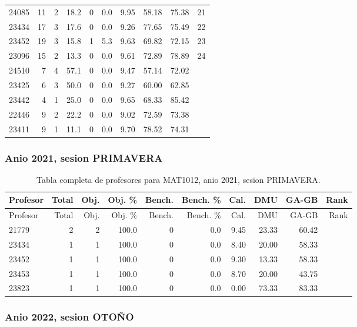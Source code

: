 \begin{longtable}{lrrrrrrrrr}
24085 & 11 & 2 & 18.2 & 0 & 0.0 & 9.95 & 58.18 & 75.38 & 21 \\
23434 & 17 & 3 & 17.6 & 0 & 0.0 & 9.26 & 77.65 & 75.49 & 22 \\
23452 & 19 & 3 & 15.8 & 1 & 5.3 & 9.63 & 69.82 & 72.15 & 23 \\
23096 & 15 & 2 & 13.3 & 0 & 0.0 & 9.61 & 72.89 & 78.89 & 24 \\
24510 & 7 & 4 & 57.1 & 0 & 0.0 & 9.47 & 57.14 & 72.02 &  \\
23425 & 6 & 3 & 50.0 & 0 & 0.0 & 9.27 & 60.00 & 62.85 &  \\
23442 & 4 & 1 & 25.0 & 0 & 0.0 & 9.65 & 68.33 & 85.42 &  \\
22446 & 9 & 2 & 22.2 & 0 & 0.0 & 9.02 & 72.59 & 73.38 &  \\
23411 & 9 & 1 & 11.1 & 0 & 0.0 & 9.70 & 78.52 & 74.31 &  \\
\bottomrule
\end{longtable}
\endgroup

\subsubsection{Anio 2021, sesion PRIMAVERA}

\begingroup
\scriptsize
\setlength{\tabcolsep}{3pt}
\begin{longtable}{lrrrrrrrrr}
\caption{Tabla completa de profesores para MAT1012, anio 2021, sesion PRIMAVERA.}\label{tab:prof-period-mat1012-2021-primavera-especializado}\\
\toprule
Profesor & Total & Obj. & Obj. \% & Bench. & Bench. \% & Cal. & DMU & GA-GB & Rank \\
\midrule
\endfirsthead
\toprule
Profesor & Total & Obj. & Obj. \% & Bench. & Bench. \% & Cal. & DMU & GA-GB & Rank \\
\midrule
\endhead
21779 & 2 & 2 & 100.0 & 0 & 0.0 & 9.45 & 23.33 & 60.42 &  \\
23434 & 1 & 1 & 100.0 & 0 & 0.0 & 8.40 & 20.00 & 58.33 &  \\
23452 & 1 & 1 & 100.0 & 0 & 0.0 & 9.30 & 13.33 & 58.33 &  \\
23453 & 1 & 1 & 100.0 & 0 & 0.0 & 8.70 & 20.00 & 43.75 &  \\
23823 & 1 & 1 & 100.0 & 0 & 0.0 & 0.00 & 73.33 & 83.33 &  \\
\bottomrule
\end{longtable}
\endgroup

\subsubsection{Anio 2022, sesion OTOÑO}

